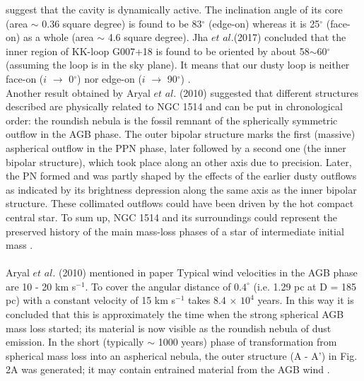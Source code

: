 \documentclass[fleqn,a4paper,12pt,oneside]{article}
\begin{document}
suggest that the cavity is dynamically active. The inclination
angle of its core (area $\sim$ 0.36 square degree) is found to be
83$^{\circ}$ (edge-on) whereas it is 25$^{\circ}$ (face-on) as a
whole (area $\sim$ 4.6 square degree). Jha $et$ $al$.(2017) concluded that the inner region
of KK-loop G007+18 is found to be oriented by about
58$\sim$60$^{\circ}$ (assuming the loop is in the sky plane). It
means that our dusty loop is neither face-on ($i$ $\rightarrow$
0$^{\circ}$) nor edge-on ($i$ $\rightarrow$ 90$^{\circ}$) \cite{akj}.
\\
Another result obtained by  Aryal $et$ $al.$ (2010)
suggested that different structures described are physically
related to NGC 1514 and can be put in chronological order: the
roundish nebula is the fossil remnant of the spherically symmetric
outflow in the AGB phase. The outer bipolar structure marks the
first (massive) aspherical outflow in the PPN phase, later
followed by a second one (the inner bipolar structure), which took
place along an other axis due to precision. Later, the PN formed
and was partly shaped by the effects of the earlier dusty outflows
as indicated by its brightness depression along the same axis as
the inner bipolar structure. These collimated outflows could have
been driven by the hot compact central star. To sum up, NGC 1514
and its surroundings could represent the preserved history of the
main mass-loss phases of a star of intermediate initial
mass \cite{B_4}.
\\
\\
Aryal $et$ $al$. (2010) mentioned in paper Typical wind velocities
in the AGB phase are 10 - 20 km s$^{-1}$. To cover the angular
distance of $0.4^{\circ}$ (i.e. 1.29 pc at D = 185 pc) with a
constant velocity of 15 km s$^{-1}$ takes 8.4 $\times$ $10^{4}$
years. In this way it is concluded that  this is approximately the
time when the strong spherical AGB mass loss started; its material
is now visible as the roundish nebula of dust emission. In the
short (typically $\sim$ 1000 years) phase of transformation from
spherical mass loss into an aspherical nebula, the outer structure
(A - A') in Fig. 2A was generated; it may contain entrained
material from the AGB wind \cite{B_4}.
\end{document}

